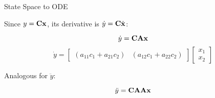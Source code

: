 \documentclass{beamer}
\begin{document}
\begin{frame}{State Space to ODE}
	\begin{flushleft}
		
		Since $y = \mathbf{C} \mathbf{x}$, its derivative is $\dot y = \mathbf{C} \dot{\mathbf{x}}$:
		
		\begin{equation}
			\dot y = \mathbf{C} \mathbf{A} \mathbf{x}
		\end{equation}
		\begin{equation}
			\dot y = 
			\begin{bmatrix}
				(a_{11}c_1 + a_{21}c_2) & (a_{12}c_1 + a_{22}c_2)
			\end{bmatrix}
		\begin{bmatrix}
			x_1 \\ x_2
		\end{bmatrix}
		\end{equation}
		
		Analogous for $\ddot y$:
		
		\begin{equation}
			\ddot y = \mathbf{C} \mathbf{A} \mathbf{A} \mathbf{x}
		\end{equation}
		
	\end{flushleft}
\end{frame}
\end{document}
